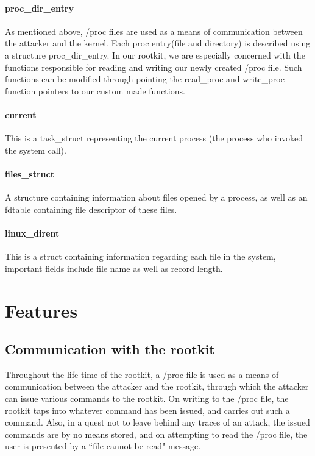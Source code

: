 \documentclass{article}
\begin{document}
    \paragraph{proc\_dir\_entry} As mentioned above, /proc files are used as a means of communication between the attacker and the kernel. Each proc entry(file and directory) is described using a structure proc\_dir\_entry. In our rootkit, we are especially concerned with the functions responsible for reading and writing our newly created /proc file. Such functions can be modified through pointing the read\_proc and write\_proc function pointers to our custom made functions.
    
    \paragraph{current} This is a task\_struct representing the current process (the process who invoked the system call).
    
    \paragraph{files\_struct} A structure containing information about files opened by a process, as well as an fdtable containing file descriptor of these files.
    
    \paragraph{linux\_dirent} This is a struct containing information regarding each file in the system, important fields include file name as well as record length.
    
\section{Features}

\subsection{Communication with the rootkit}
    
    Throughout the life time of the rootkit, a /proc file is used as a means of communication between the attacker and the rootkit, through which the attacker can issue various commands to the rootkit. On writing to the /proc file, the rootkit taps into whatever command has been issued, and carries out such a command. Also, in a quest not to leave behind any traces of an attack, the issued commands are by no means stored, and on attempting to read the /proc file, the user is presented by a ``file cannot be read" message.
\end{document}
